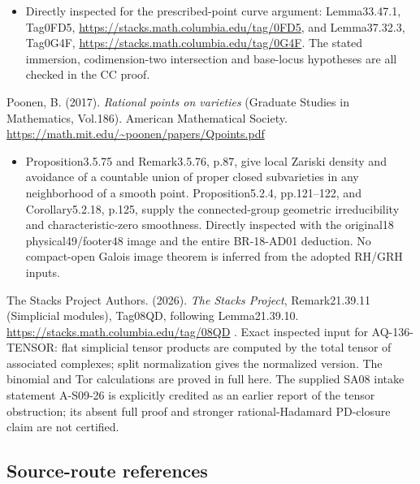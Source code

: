 \documentclass[11pt,a4paper]{article}
\providecommand{\tightlist}{\setlength{\itemsep}{0pt}\setlength{\parskip}{0pt}}
\theoremstyle{definition}\newtheorem{definition}[theorem]{Definition}
\theoremstyle{remark}\newtheorem{remark}[theorem]{Remark}
\begin{document}
\begin{itemize}
\tightlist
\item
  Directly inspected for the prescribed-point curve argument:
  Lemma33.47.1, Tag0FD5,
  \url{https://stacks.math.columbia.edu/tag/0FD5}, and Lemma37.32.3,
  Tag0G4F, \url{https://stacks.math.columbia.edu/tag/0G4F}. The stated
  immersion, codimension-two intersection and base-locus hypotheses are
  all checked in the CC proof.
\end{itemize}

Poonen, B. (2017). \emph{Rational points on varieties} (Graduate Studies
in Mathematics, Vol.186). American Mathematical Society.
\url{https://math.mit.edu/~poonen/papers/Qpoints.pdf}

\begin{itemize}
\tightlist
\item
  Proposition3.5.75 and Remark3.5.76, p.87, give local Zariski density
  and avoidance of a countable union of proper closed subvarieties in
  any neighborhood of a smooth point. Proposition5.2.4, pp.121--122, and
  Corollary5.2.18, p.125, supply the connected-group geometric
  irreducibility and characteristic-zero smoothness. Directly inspected
  with the original18 physical49/footer48 image and the entire
  BR-18-AD01 deduction. No compact-open Galois image theorem is inferred
  from the adopted RH/GRH inputs.
\end{itemize}

The Stacks Project Authors. (2026). \emph{The Stacks Project},
Remark21.39.11 (Simplicial modules), Tag08QD, following Lemma21.39.10.
\url{https://stacks.math.columbia.edu/tag/08QD} . Exact inspected input
for AQ-136-TENSOR: flat simplicial tensor products are computed by the
total tensor of associated complexes; split normalization gives the
normalized version. The binomial and Tor calculations are proved in full
here. The supplied SA08 intake statement A-S09-26 is explicitly credited
as an earlier report of the tensor obstruction; its absent full proof
and stronger rational-Hadamard PD-closure claim are not certified.

\subsection{Source-route references}\label{source-route-references}
\end{document}
